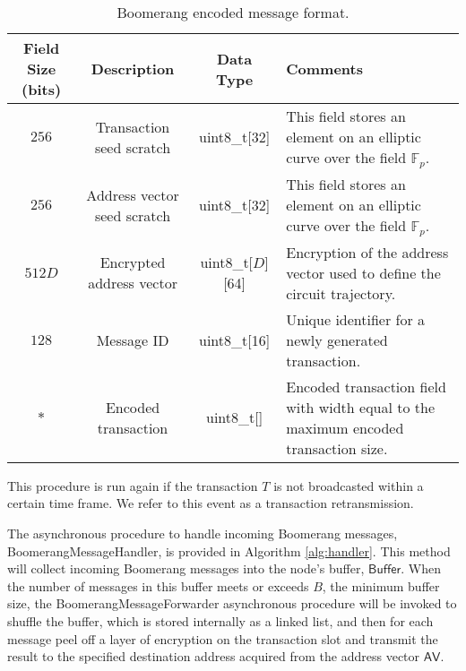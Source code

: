 \begin{table*}
\begin{center}
\caption{Boomerang encoded message format.}
\label{tab:encoded-tx-format}
    \begin{tabular}{|c|c|c|l|} \hline
    \textbf{Field Size (bits)} & {\bf Description} & {\bf Data Type} & {\bf Comments} \\ \hline
    $256$ & Transaction seed scratch & uint8\_t[32] & This field stores an element on an elliptic curve over the field $\mathbb{F}_p$. \\
    $256$ & Address vector seed scratch & uint8\_t[32] & This field stores an element on an elliptic curve over the field $\mathbb{F}_p$. \\
    $512D$ & Encrypted address vector & uint8\_t[$D$][64] & Encryption of the address vector used to define the circuit trajectory. \\
    $128$ & Message ID & uint8\_t[16] & Unique identifier for a newly generated transaction. \\
    $*$ & Encoded transaction & uint8\_t[] & Encoded transaction field with width equal to the maximum encoded transaction size. \\ \hline
    \end{tabular}
\end{center}
\end{table*}

This procedure is run again if the transaction $T$ is not broadcasted within a certain time frame. We refer to this event as a transaction retransmission. 

The asynchronous procedure to handle incoming Boomerang messages, {\sf BoomerangMessageHandler}, is provided in Algorithm \ref{alg:handler}. This method will collect incoming Boomerang messages into the node's buffer, $\mathsf{Buffer}$. When the number of messages in this buffer meets or exceeds $B$, the minimum buffer size, the {\sf BoomerangMessageForwarder} asynchronous procedure will be invoked to shuffle the buffer, which is stored internally as a linked list, and then for each message peel off a layer of encryption on the transaction slot and transmit the result to the specified destination address acquired from the address vector $\mathsf{AV}$.

